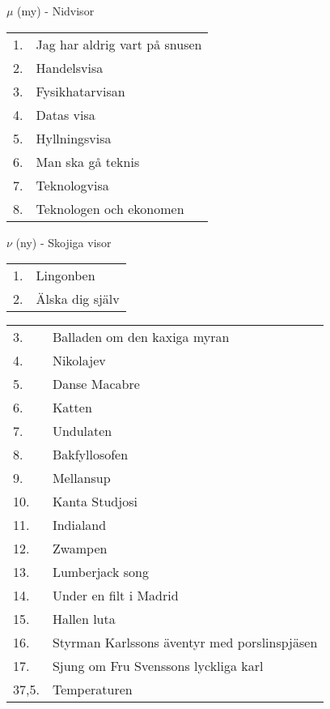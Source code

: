\documentclass[a6paper,10pt]{article}
\begin{document}
\vspace{-6pt}
\noindent
\Large $\mu$ (my) - Nidvisor
\vspace{-5pt}
\begin{table}[!h]
\begin{tabularx}{1\textwidth}{l X}
1.&Jag har aldrig vart på snusen\\
2.&Handelsvisa\\
3.&Fysikhatarvisan\\
4.&Datas visa\\
5.&Hyllningsvisa\\
6.&Man ska gå teknis \\
7.&Teknologvisa\\
8.&Teknologen och ekonomen
\end{tabularx}
\end{table}

\noindent
\Large $\nu$ (ny) - Skojiga visor
\vspace{-5pt}
\begin{table}[!h]
\begin{tabularx}{1\textwidth}{l X}
1.&Lingonben\\
2.&Älska dig själv\\
\end{tabularx}
\end{table}
\begin{table}[!h]
\begin{tabularx}{1\textwidth}{l X}
3.&Balladen om den kaxiga myran\\
4.&Nikolajev\\
5.&Danse Macabre\\
6.&Katten \\
7.&Undulaten \\
8.&Bakfyllosofen\\
9.&Mellansup\\
10.&Kanta Studjosi\\
11.&Indialand\\
12.&Zwampen\\
13.&Lumberjack song\\
14.&Under en filt i Madrid\\
15.&Hallen luta\\
16.&Styrman Karlssons äventyr med porslinspjäsen\\
17.&Sjung om Fru Svenssons lyckliga karl\\
37,5.&Temperaturen
\end{tabularx}
\end{table}
\end{document}
